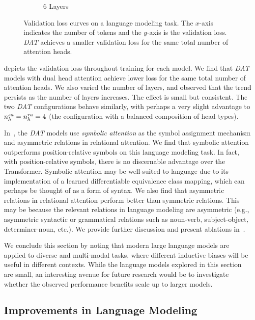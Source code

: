 \begin{figure}[ht]
\begin{subfigure}{0.33\textwidth}
        \caption{6 Layers}
    \end{subfigure}
    \caption{Validation loss curves on a language modeling task. The $x$-axis indicates the number of tokens and the $y$-axis is the validation loss. \textit{DAT} achieves a smaller validation loss for the same total number of attention heads.}\label{fig:tiny_stories_val_loss_curves}
\end{figure}

 depicts the validation loss throughout training for each model. We find that \textit{DAT} models with dual head attention achieve lower loss for the same total number of attention heads. We also varied the number of layers, and observed that the trend persists as the number of layers increases. The effect is small but consistent. The two \textit{DAT} configurations behave similarly, with perhaps a very slight advantage to $n_h^{sa} = n_h^{ra} = 4$ (the configuration with a balanced composition of head types).

In~, the \textit{DAT} models use \textit{symbolic attention} as the symbol assignment mechanism and asymmetric relations in relational attention. We find that symbolic attention outperforms position-relative symbols on this language modeling task. In fact, with position-relative symbols, there is no discernable advantage over the Transformer. Symbolic attention may be well-suited to language due to its implementation of a learned differentiable equivalence class mapping, which can perhaps be thought of as a form of syntax. We also find that asymmetric relations in relational attention perform better than symmetric relations. This may be because the relevant relations in language modeling are asymmetric (e.g., asymmetric syntactic or grammatical relations such as noun-verb, subject-object, determiner-noun, etc.). We provide further discussion and present ablations in~.

We conclude this section by noting that modern large language models are applied to diverse and multi-modal tasks, where different inductive biases will be useful in different contexts. While the language models explored in this section are small, an interesting avenue for future research would be to investigate whether the observed performance benefits scale up to larger models.

\subsection{Improvements in Language Modeling}

